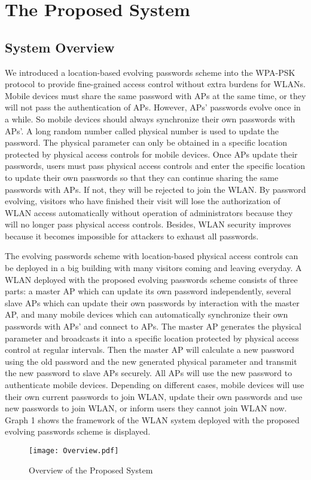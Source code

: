 \section{The Proposed System}
\subsection{System Overview}
We introduced a location-based evolving passwords scheme into the WPA-PSK protocol to provide fine-grained access control without extra burdens for WLANs. Mobile devices must share the same password with APs at the same time, or they will not pass the authentication of APs. However, APs’ passwords evolve once in a while. So mobile devices should always synchronize their own passwords with APs’. A long random number called physical number is used to update the password. The physical parameter can only be obtained in a specific location protected by physical access controls for mobile devices. Once APs update their passwords, users must pass physical access controls and enter the specific location to update their own passwords so that they can continue sharing the same passwords with APs. If not, they will be rejected to join the WLAN. By password evolving, visitors who have finished their visit will lose the authorization of WLAN access automatically without operation of administrators because they will no longer pass physical access controls. Besides, WLAN security improves because it becomes impossible for attackers to exhaust all passwords. 

The evolving passwords scheme with location-based physical access controls can be deployed in a big building with many visitors coming and leaving everyday. A WLAN deployed with the proposed evolving passwords scheme consists of three parts: a master AP which can update its own password independently, several slave APs which can update their own passwords by interaction with the master AP, and many mobile devices which can automatically synchronize their own passwords with APs’ and connect to APs. The master AP generates the physical parameter and broadcasts it into a specific location protected by physical access control at regular intervals. Then the master AP will calculate a new password using the old password and the new generated physical parameter and transmit the new password to slave APs securely. All APs will use the new password to authenticate mobile devices. Depending on different cases, mobile devices will use their own current passwords to join WLAN, update their own passwords and use new passwords to join WLAN, or inform users they cannot join WLAN now. Graph 1 shows the framework of the WLAN system deployed with the proposed evolving passwords scheme is displayed. 
\begin{figure}
	\begin{center}
		\texttt{[image: Overview.pdf]}
		\caption{Overview of the Proposed System}
		\label{Fig:4.2}
	\end{center}
\end{figure}

